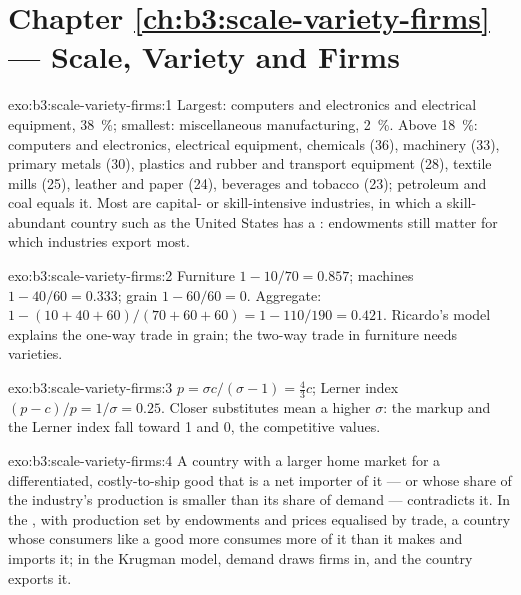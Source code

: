 \section*{Chapter \ref{ch:b3:scale-variety-firms} --- Scale, Variety and Firms}

\begin{solution}{exo:b3:scale-variety-firms:1}
Largest: computers and electronics and electrical equipment, 38~\%; smallest:
miscellaneous manufacturing, 2~\%. %
Above 18~\%: computers and electronics, electrical equipment, chemicals (36),
machinery (33), primary metals (30), plastics and rubber and transport equipment
(28), textile mills (25), leather and paper (24), beverages and tobacco (23);
petroleum and coal equals it. Most are capital- or skill-intensive industries,
in which a skill-abundant country such as the United States has a : endowments still matter for which industries export most.
\end{solution}

\begin{solution}{exo:b3:scale-variety-firms:2}
Furniture $1 - 10/70 = 0.857$; machines $1 - 40/60 = 0.333$; grain $1 - 60/60 = 0$.
Aggregate: $1 - (10 + 40 + 60)/(70 + 60 + 60) = 1 - 110/190 = 0.421$. Ricardo's model
explains the one-way trade in grain; the two-way trade in furniture needs
varieties.
\end{solution}

\begin{solution}{exo:b3:scale-variety-firms:3}
$p = \sigma c/(\sigma - 1) = \tfrac43 c$; Lerner index $(p - c)/p = 1/\sigma = 0.25$. Closer
substitutes mean a higher $\sigma$: the markup and the Lerner index fall toward 1 and 0,
the competitive values.
\end{solution}

\begin{solution}{exo:b3:scale-variety-firms:4}
A country with a larger home market for a differentiated, costly-to-ship good
that is a net importer of it --- or whose share of the industry's production is
smaller than its share of demand --- contradicts it. In the ,
with production set by endowments and prices equalised by trade, a country whose
consumers like a good more consumes more of it than it makes and imports it; in
the Krugman model, demand draws firms in, and the country exports it.
\end{solution}

